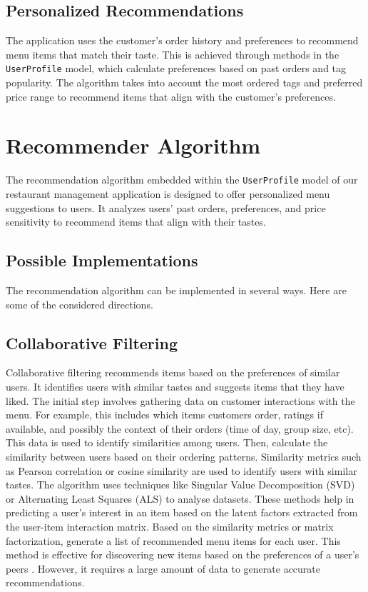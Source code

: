 \subsection{Personalized Recommendations}
The application uses the customer's order history and preferences to recommend menu items that match their taste. This is achieved through methods in the \texttt{UserProfile} model, which calculate preferences based on past orders and tag popularity. The algorithm takes into account the most ordered tags and preferred price range to recommend items that align with the customer's preferences.

\section{Recommender Algorithm}
The recommendation algorithm embedded within the \texttt{UserProfile} model of our restaurant management application is designed to offer personalized menu suggestions to users. It analyzes users' past orders, preferences, and price sensitivity to recommend items that align with their tastes.

\subsection{Possible Implementations}
The recommendation algorithm can be implemented in several ways. Here are some of the considered directions.

\subsection*{Collaborative Filtering}
Collaborative filtering recommends items based on the preferences of similar users. It identifies users with similar tastes and suggests items that they have liked. The initial step involves gathering data on customer interactions with the menu. For example, this includes which items customers order, ratings if available, and possibly the context of their orders (time of day, group size, etc). This data is used to identify similarities among users. Then, calculate the similarity between users based on their ordering patterns. Similarity metrics such as Pearson correlation or cosine similarity are used to identify users with similar tastes. The algorithm uses techniques like Singular Value Decomposition (SVD) or Alternating Least Squares (ALS) to analyse datasets. These methods help in predicting a user's interest in an item based on the latent factors extracted from the user-item interaction matrix. Based on the similarity metrics or matrix factorization, generate a list of recommended menu items for each user. This method is effective for discovering new items based on the preferences of a user's peers \cite{26} \cite{27}. However, it requires a large amount of data to generate accurate recommendations.

